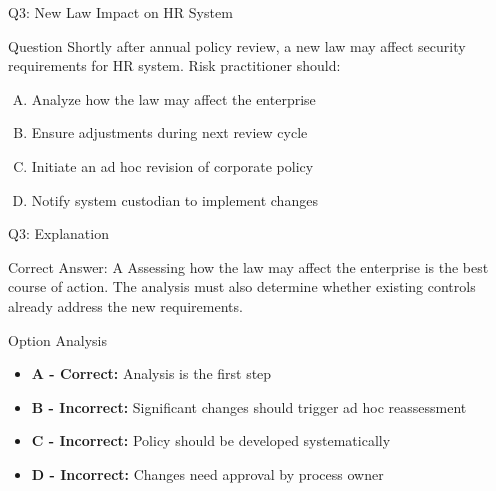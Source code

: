 \documentclass{beamer}
\begin{document}
	\begin{frame}{Q3: New Law Impact on HR System}
		\begin{block}{Question}
			Shortly after annual policy review, a new law may affect security requirements for HR system. Risk practitioner should:
		\end{block}
		\begin{enumerate}[(A)]
			\item Analyze how the law may affect the enterprise
			\item Ensure adjustments during next review cycle
			\item Initiate an ad hoc revision of corporate policy
			\item Notify system custodian to implement changes
		\end{enumerate}
	\end{frame}
	
	\begin{frame}{Q3: Explanation}
		\begin{block}{Correct Answer: A}
			Assessing how the law may affect the enterprise is the best course of action. The analysis must also determine whether existing controls already address the new requirements.
		\end{block}
		\begin{block}{Option Analysis}
			\begin{itemize}
				\item \textbf{A - Correct:} Analysis is the first step
				\item \textbf{B - Incorrect:} Significant changes should trigger ad hoc reassessment
				\item \textbf{C - Incorrect:} Policy should be developed systematically
				\item \textbf{D - Incorrect:} Changes need approval by process owner
			\end{itemize}
		\end{block}
	\end{frame}
	
\end{document}
